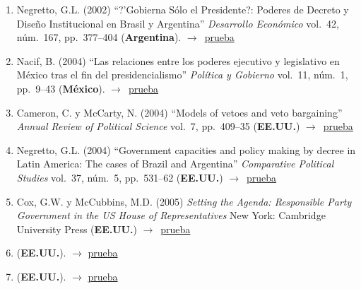 \documentclass[12 pt, letter]{article}
\newenvironment{CitasMiTrabajo}{
    \begin{footnotesize}
    \begin{enumerate}[label={\footnotesize\emph{cita~\arabic*}},ref=\arabic*] %
        \setlength{\itemsep}{.1\itemsep}
        \setlength{\parskip}{.1\parskip}
    }{\end{enumerate}\end{footnotesize}}
\begin{document}
        \begin{CitasMiTrabajo}

        \item Negretto, G.L. (2002) ``?'Gobierna S\'olo el Presidente?: Poderes de Decreto y Dise\~no Institucional en Brasil y Argentina'' \emph{Desarrollo Econ\'omico} vol.\ 42, n\'um.\ 167, pp.\ 377--404  (\textbf{Argentina}). $\rightarrow$~\href{http://ericmagar.com/cv/cites/BullyPulpits/negretto.pdf}{prueba}

        \item Nacif, B. (2004) ``Las relaciones entre los poderes ejecutivo y
        legislativo en M\'exico tras el fin del presidencialismo''
        \emph{Pol\'itica y Gobierno} vol.\ 11, n\'um.\ 1, pp.\ 9--43  (\textbf{M\'exico}). $\rightarrow$~\href{http://ericmagar.com/cv/cites/BullyPulpits/Benito_Nacif_p-9-42.pdf}{prueba}

        \item Cameron, C. y McCarty, N. (2004) ``Models of vetoes and veto
        bargaining'' \emph{Annual Review of Political Science} vol.\ 7, pp.\ 409--35
        (\textbf{EE.UU.}) $\rightarrow$~\href{http://ericmagar.com/cv/cites/BullyPulpits/cammc.pdf}{prueba}

        \item Negretto, G.L. (2004) ``Government capacities and
        policy making by decree in Latin America: The cases of Brazil and
        Argentina'' \emph{Comparative Political Studies} vol.\ 37, n\'um.\ 5, pp.\ 531--62
        (\textbf{EE.UU.}) $\rightarrow$~\href{http://ericmagar.com/cv/cites/BullyPulpits/neg2.pdf}{prueba}

        \item Cox, G.W. y McCubbins, M.D. (2005)
        \emph{Setting the Agenda: Responsible Party Government in the US House of Representatives} New
        York: Cambridge University Press (\textbf{EE.UU.}) $\rightarrow$~\href{http://ericmagar.com/cv/cites/BullyPulpits/coxmcS.pdf}{prueba}

        \item {} (\textbf{EE.UU.}). $\rightarrow$ \href{http://ericmagar.com/cv/cites/BullyPulpits/pachon2008phd.pdf}{prueba}

        \item {} (\textbf{EE.UU.}). $\rightarrow$ \href{http://ericmagar.com/cv/cites/BullyPulpits/mejia.pdf}{prueba}


\end{CitasMiTrabajo}
\end{document}

